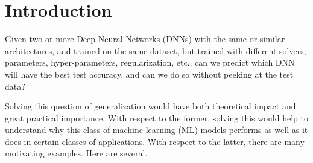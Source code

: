 
\section{Introduction}
\label{sxn:intro}

Given two or more Deep Neural Networks (DNNs) with the same or similar architectures, and trained on the same dataset, but trained with different solvers, parameters, hyper-parameters, regularization, etc., can we predict which DNN will have the best test accuracy, and can we do so without peeking at the test data?   

Solving this question of generalization would have both theoretical impact and great practical importance. 
With respect to the former, solving this would help to understand why this class of machine learning (ML) models performs as well as it does in certain classes of applications.
With respect to the latter, there are many motivating examples.
% 
Here are several.
